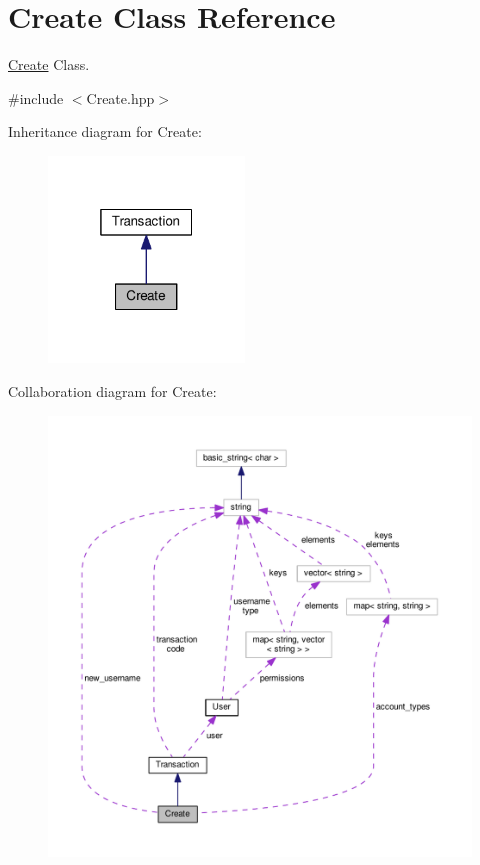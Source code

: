 \hypertarget{class_create}{\section{Create Class Reference}
\label{class_create}
}


\hyperlink{class_create}{Create} Class.  




{\ttfamily \#include $<$Create.\-hpp$>$}



Inheritance diagram for Create\-:\nopagebreak
\begin{figure}[H]
\begin{center}
\leavevmode
\includegraphics[width=148pt]{class_create__inherit__graph}
\end{center}
\end{figure}


Collaboration diagram for Create\-:\nopagebreak
\begin{figure}[H]
\begin{center}
\leavevmode
\includegraphics[width=350pt]{class_create__coll__graph}
\end{center}
\end{figure}
